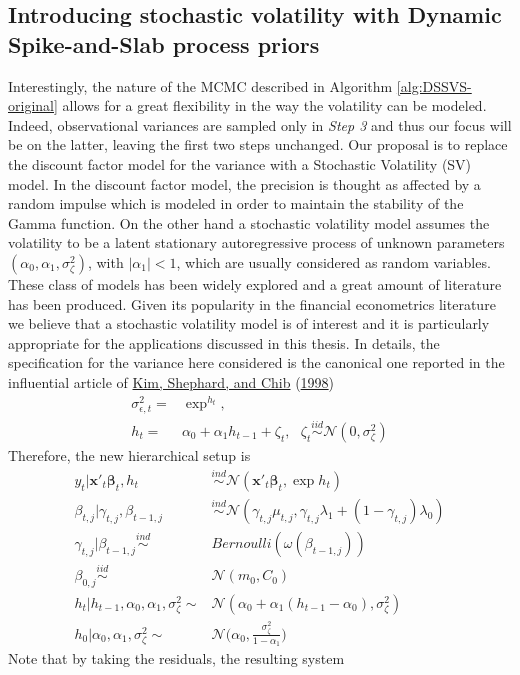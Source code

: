 \documentclass[
  12pt,
]{book}
\theoremstyle{break}
\theoremstyle{nonumberplain}
\begin{document}
\subsection{Introducing stochastic volatility with Dynamic Spike-and-Slab process priors}\label{A new proposal for the volatility process}

Interestingly, the nature of the MCMC described in Algorithm
\ref{alg:DSSVS-original} allows for a great flexibility in the way the
volatility can be modeled. Indeed, observational variances are sampled
only in \emph{Step 3} and thus our focus will be on the latter, leaving
the first two steps unchanged. Our proposal is to replace the discount
factor model for the variance with a Stochastic Volatility (SV) model.
In the discount factor model, the precision is thought as affected by a
random impulse which is modeled in order to maintain the stability of
the Gamma function. On the other hand a stochastic volatility model
assumes the volatility to be a latent stationary autoregressive process
of unknown parameters \((\alpha_{0},\alpha_{1},\sigma^{2}_{\zeta})\),
with \(|\alpha_{1}|<1\), which are usually considered as random
variables. These class of models has been widely explored and a great
amount of literature has been produced. Given its popularity in the
financial econometrics literature we believe that a stochastic
volatility model is of interest and it is particularly appropriate for
the applications discussed in this thesis. In details, the specification
for the variance here considered is the canonical one reported in the
influential article of \protect\hyperlink{ref-KSC_1998}{Kim, Shephard,
and Chib} (\protect\hyperlink{ref-KSC_1998}{1998}) \begin{align*}
\sigma^{2}_{\epsilon,t}=&\exp^{h_{t}},\\
h_{t}= & \alpha_{0}+\alpha_{1}h_{t-1}+\zeta_{t}, \ \ \ \zeta_{t}\overset{iid}{\sim}\mathcal{N}(0,\sigma^{2}_{\zeta})
\end{align*} Therefore, the new hierarchical setup is \begin{equation}
  \begin{aligned}\label{eq:setup}
  y_{t}|\boldsymbol{x'}_{t}\boldsymbol{\beta}_{t},h_{t} & \overset{ind}{\sim}\mathcal{N}(\boldsymbol{x'}_{t}\boldsymbol{\beta}_{t},\exp{h_{t}}) \\
  \beta_{t,j}|\gamma_{t,j},\beta_{t-1,j} & \overset{ind}{\sim}\mathcal{N}(\gamma_{t,j}\mu_{t,j},\gamma_{t,j}\lambda_{1}+(1-\gamma_{t,j})\lambda_{0})\\
  \gamma_{t,j}|\beta_{t-1,j}\overset{ind}{\sim}& Bernoulli(\omega(\beta_{t-1,j}))\\
  \beta_{0,j}\overset{iid}{\sim}& \mathcal{N}(m_{0},C_{0}) \\
  h_{t}|h_{t-1},\alpha_{0},\alpha_{1},\sigma^{2}_{\zeta}\sim & \mathcal{N}(\alpha_{0}+\alpha_{1}(h_{t-1}-\alpha_0),\sigma^{2}_{\zeta})\\
  h_{0}|\alpha_{0},\alpha_{1},\sigma^{2}_{\zeta}\sim & \mathcal{N}\bigg(\alpha_{0},\frac{\sigma^{2}_{\zeta}}{1-\alpha_{1}}\bigg)
  \end{aligned}
  \end{equation} Note that by taking the residuals, the resulting system
\end{document}
